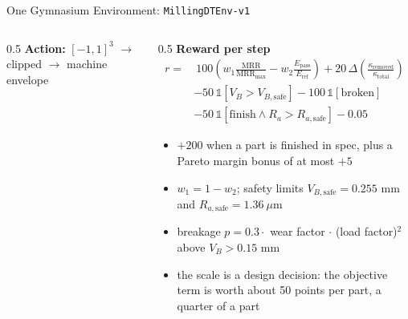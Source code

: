 \documentclass[11pt,aspectratio=169]{beamer}
\newcommand{\MRR}{\mathrm{MRR}}
\newcommand{\Ra}{R_a}
\newcommand{\RaSafe}{R_{a,\text{safe}}}
\newcommand{\VB}{V_B}
\newcommand{\VBSafe}{V_{B,\text{safe}}}
\begin{document}
\begin{frame}{One Gymnasium Environment: \texttt{MillingDTEnv-v1}}
\begin{columns}[T]
\begin{column}{0.5\textwidth}
            \textbf{Action:} $[-1,1]^3$ $\to$ clipped $\to$ machine envelope
        \end{column}
        \begin{column}{0.5\textwidth}
            \textbf{Reward per step}
            \setlength{\jot}{3pt}
            \begin{align}
                r = &\ 100\left(w_1 \frac{\MRR}{\MRR_\text{max}} - w_2 \frac{E_\text{pass}}{E_\text{ref}}\right)
                    + 20\,\Delta\!\left(\tfrac{\kappa_\text{removed}}{\kappa_\text{total}}\right) \\
                    &- 50\,\mathbb{1}[\VB > \VBSafe] - 100\,\mathbb{1}[\text{broken}] \\
                    &- 50\,\mathbb{1}[\text{finish} \wedge \Ra > \RaSafe] - 0.05
            \end{align}
            \vspace{0.2em}
            \begin{itemize}
                \item $+200$ when a part is finished in spec, plus a Pareto margin bonus of at most $+5$
                \item $w_1 = 1 - w_2$; safety limits $\VBSafe = 0.255$ mm and $\RaSafe = 1.36\ \mu$m
                \item breakage $p = 0.3 \cdot$ wear factor $\cdot$ (load factor)$^2$ above $\VB > 0.15$ mm
                \item \alert{the scale is a design decision}: the objective term is worth about 50 points per part, a quarter of a part
            \end{itemize}
        \end{column}
    \end{columns}
\end{frame}
\end{document}

